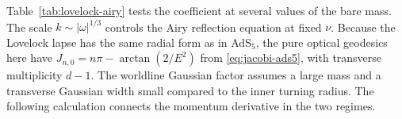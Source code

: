 Table~\ref{tab:lovelock-airy} tests the coefficient at several
values of the bare mass. The scale \(k\sim|\omega|^{1/3}\)
controls the Airy reflection equation at fixed \(\nu\).
Because the Lovelock lapse has the same radial form as in AdS\(_5\),
the pure optical geodesics here have
\(J_{n,0}=n\pi-\arctan(2/E^2)\) from \eqref{eq:jacobi-ads5},
with transverse multiplicity \(d-1\).
The worldline Gaussian factor assumes a large mass and a transverse
Gaussian width small compared to the inner turning radius.
The following calculation connects the momentum derivative in the
two regimes.


